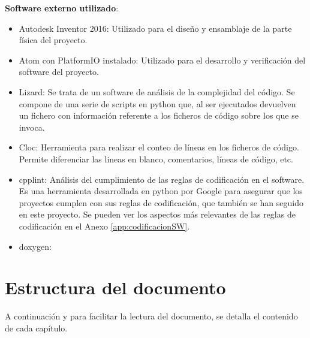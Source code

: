 \textbf{Software externo utilizado}:
    \begin{itemize}
        \item Autodesk Inventor 2016: Utilizado para el diseño y ensamblaje de la parte física del proyecto. 
        \item Atom con PlatformIO instalado: Utilizado para el desarrollo y verificación del software del proyecto.
        \item Lizard: Se trata de un software de análisis de la complejidad del código. Se compone de una serie de scripts en python que, al ser ejecutados devuelven un fichero con información referente a los ficheros de código sobre los que se invoca.
        \item Cloc: Herramienta para realizar el conteo de líneas en los ficheros de código. Permite diferenciar las lineas en blanco, comentarios, líneas de código, etc.
        \item cpplint: Análisis del cumplimiento de las reglas de codificación en el software. Es una herramienta desarrollada en python por Google para asegurar que los proyectos cumplen con sus reglas de codificación, que también se han seguido en este proyecto. Se pueden ver los aspectos más relevantes de las reglas de codificación en el Anexo \ref{app:codificacionSW}.
        \item doxygen:
    \end{itemize}



\section{Estructura del documento}

    A continuación y para facilitar la lectura del documento, se detalla el contenido de cada capítulo.
    

